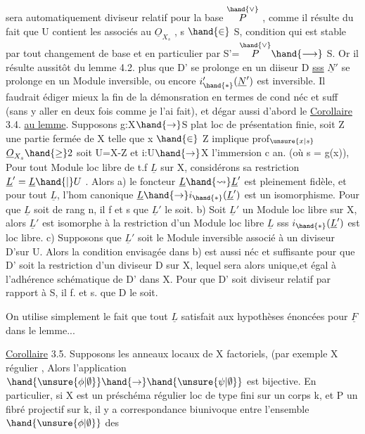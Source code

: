 
sera automatiquement diviseur relatif pour la base $\overset{\hand{\vee}}{P}$ , comme il
résulte du fait que U contient les  associés au $\underline{O}_{X_s}$ , s $\hand{\in}$ S,
condition qui est stable par tout changement de base et en particulier
par S'=$\overset{\hand{\vee}}{P} \hand{\longrightarrow}$ S. Or il résulte aussitôt du lemme 4.2. plus  que D' se
prolonge en un diiseur  D \uline{sss} $\underline{N}'$ se prolonge en un Module
inversible, ou encore $i'_{\hand{*}}(\underline{N}')$ est inversible.  Il faudrait édiger
mieux la fin de la démonsration en termes de cond néc et suff (sans y
aller en deux fois comme je l'ai fait), et dégar aussi d'abord le
\placedmargin{$|$}\uline{Corollaire} 3.4. \uline{au lemme}. Supposons g:X$\hand{\to}$S plat loc de présentation finie,
soit Z une partie fermée de X telle que x $\hand{\in}$ Z implique prof$_{\unsure{x|s}}$ $\underline{O}_{X_s} \hand{\geq} 2$
soit U=X-Z et i:U$\hand{\to}$X l'immersion c an.
(où s = g(x)), 
 Pour tout Module loc libre de t.f $\underline{L}$ sur X,
considérons sa restriction $\underline{L}' = \underline{L}\hand{|}U$ . Alors a) le foncteur $\underline{L} \hand{\rightsquigarrow} \underline{L}'$ est
pleinement fidèle, et pour  tout $\underline{L}$, 
l'hom canonique $\underline{L} \hand{\to} i_{\hand{*}}(\underline{L}')$ est un isomorphisme. Pour que $\underline{L}$ soit de rang n, il f et s que $\underline{L}'$ le soit. b) Soit $\underline{L}'$ un
Module loc libre sur X, alors $\underline{L}'$ est isomorphe à la restriction d'un
Module loc libre $\underline{L}$ sss $i_{\hand{*}}(\underline{L}')$ est loc libre. c) Supposons que $\underline{L}'$ soit
le Module inversible associé à un diviseur  D'\hand{/}sur U. Alors
la condition envisagée dans b) est aussi néc et suffisante pour que D'
soit la restriction d'un diviseur  D sur X, lequel sera alors unique,et égal à l'adhérence schématique de D' dans X. Pour que D' soit
diviseur  relatif par rapport à S, il f. et s. que D le soit.

On utilise simplement le fait que tout $\underline{L}$ satisfait aux 
hypothèses énoncées pour $\underline{F}$ dans le lemme...

\uline{Corollaire} 3.5. Supposons les anneaux locaux de X factoriels, (par exemple X régulier\hand{)} , Alors l'application $\hand{\unsure{\phi|\emptyset}} \hand{\to} \hand{\unsure{\psi|\emptyset}}$ est bijective. En particulier, si X est
un préschéma régulier loc de type fini sur un corps k, et P un fibré
projectif sur k, il y a correspondance biunivoque entre l'ensemble $\hand{\unsure{\phi|\emptyset}}$ des

